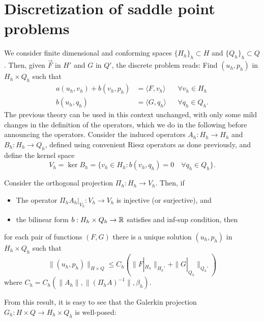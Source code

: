 \section{Discretization of saddle point problems}\label{sec:discretization-saddle-point}
We consider finite dimensional and conforming spaces $\{H_h\}_h \subset H$ and $\{Q_h\}_h \subset Q$. Then, given $\vec F$ in $H'$ and $G$ in $Q'$, the discrete problem reads: Find $(u_h, p_h)$ in $H_h \times Q_h$ such that 
\begin{equation}
    \begin{aligned}
        a(u_h, v_h) + b(v_h, p_h) &= \langle F, v_h\rangle &&\forall v_h \in H_h \\
        b(u_h, q_h)  &= \langle G, q_h\rangle &&\forall q_h \in Q_h. 
    \end{aligned}
\end{equation}
The previous theory can be used in this context unchanged, with only some mild changes in the definition of the operators, which we do in the following before announcing the operators. Consider the induced operators $A_h:H_h\to H_h$ and $B_h: H_h\to Q_h$, defined using convenient Riesz operators as done previously, and define the kernel space 
\begin{equation}
    V_h = \ker B_h = \{v_h \in H_h: b(v_h, q_h) = 0 \quad\forall q_h \in Q_h\}.
\end{equation}
\begin{theorem}\label{thm:uniqueness-mixed} 
    Consider the orthogonal projection $\Pi_h: H_h \to V_h$. Then, if 
    \begin{itemize}
        \item The operator $\Pi_h A_h|_{V_h}: V_h\to V_h$ is injective (or surjective), and
        \item the bilinear form $b:H_h\times Q_h\to \mathbb{R}$ satisfies and inf-sup condition, then
    \end{itemize}
    for each pair of functions $(F, G)$ there is a unique solution $(u_h, p_h)$ in $H_h\times Q_h$ such that 
    \begin{equation}
        \| (u_h, p_h) \|_{H\times Q} \leq C_h\left( \|F|_{H_h}\|_{H_h'} + \| G|_{Q_h} \|_{Q_h'} \right)
    \end{equation}
    where $C_h = C_h(\| A_h\|, \| (\Pi_h A)^{-1} \|, \beta_h)$. 
    \end{theorem}
    From this result, it is easy to see that the Galerkin projection $G_h: H\times Q \to H_h\times Q_h$ is well-posed: 
